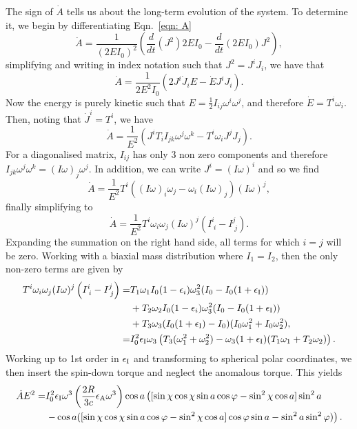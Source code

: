 \documentclass[../full_thesis/full_thesis.tex]{subfiles}
\begin{document}
The sign of $\dot{A}$ tells us about the long-term evolution of the system. To
determine it, we begin by differentiating Eqn.~\eqref{eqn: A}
\begin{equation}
\dot{A}=\frac{1}{(2EI_{0})^{2}}
        \left(\frac{d}{dt}(J^{2})2EI_{0}-\frac{d}{dt}(2EI_{0})J^{2}\right),
\end{equation}
simplifying and writing in index notation such that $J^{2}=J^i J_i$, we have that
\begin{equation}
\dot{A}=\frac{1}{2E^{2}I_0}\left(2J^{i}\dot{J}_{i}E-\dot{E}J^{i}J_{i}\right).
\end{equation}
Now the energy is purely kinetic such that
$E=\frac{1}{2}I_{ij}\omega^{i}\omega^{j}$, and therefore $\dot{E}=T^{i}\omega_{i}$.
Then, noting that $\dot{J}^{i}=T^{i}$, we have
\begin{equation}
\dot{A}=\frac{1}{E^{2}}\left(J^{i}T_{i}I_{jk}\omega^{j}\omega^{k}
                             -T^{i}\omega_{i}J^{j}J_{j}\right).
\end{equation}
For a diagonalised matrix, $I_{ij}$ has only 3 non zero components and therefore
$I_{jk}\omega^{j}\omega^{k}=(I\omega)_{j}\omega^{j}$. In addition, we can write
$J^{i}=(I\omega)^{i}$ and so we find
\begin{equation}
\dot{A}=\frac{1}{E^{2}}T^{i}\left((I\omega)_{i}\omega_{j}
        -\omega_{i}(I\omega)_{j}\right)(I\omega)^{j},
\end{equation}
finally simplifying to
\begin{equation}
\dot{A}=\frac{1}{E^{2}}T^{i}\omega_{i}\omega_{j}
        (I\omega)^{j}\left(I^{i}_{\;i}-I^{j}_{\;j}\right).
\end{equation}
Expanding the
summation on the right hand side, all terms for which $i=j$ will be zero. Working with a biaxial mass
distribution where $I_{1}=I_{2}$, then the only non-zero terms are given by
\begin{align}
T^{i}\omega_{i}\omega_{j}(I\omega)^{j}\left(I^{i}_{\;i}-I^{j}_{\;j}\right) =&
T_{1}\omega_{1}I_{0}(1-\epsilon_{i})\omega^{2}_{3}
(I_{0}-I_{0}(1+\epsilon_{\mathrm{I}}))
\nonumber \\
 & + T_{2}\omega_{2}I_{0}(1-\epsilon_{i})\omega^{2}_{3}(I_{0}-I_{0}(1+\epsilon_{\mathrm{I}}))
\nonumber \\ 
& +
T_{3}\omega_{3}(I_{0}(1+\epsilon_{\mathrm{I}})-I_{0})
               (I_{0}\omega_{1}^{2}+I_{0}\omega_{2}^{2}), \\
=& I_{0}^{2}\epsilon_{\mathrm{I}}\omega_{3}\left(T_{3}(\omega_{1}^{2}+\omega_{2}^{2})
    - \omega_{3}(1+\epsilon_{\mathrm{I}})(T_{1}\omega_{1}+T_{2}\omega_{2})\right).
\end{align}
Working up to 1st order in $\epsilon_{\mathrm{I}}$ and transforming to spherical polar
coordinates, we then insert the spin-down torque and neglect the anomalous torque.
This yields
\begin{align}
\dot{A}E^{2} = & I_{0}^{2}\epsilon_{\mathrm{I}}\omega^{3}
    \left(\frac{2R}{3c}\epsilon_{\mathrm{A}}\omega^{3}\right)
    \cos a \left([\sin \chi \cos \chi \sin a \cos \varphi
                 - \sin^{2}\chi \cos a]\sin^{2} a \right. \nonumber \\
& \left.- \cos a ([\sin \chi \cos \chi \sin a \cos \varphi
                   - \sin^{2}\chi \cos a]\cos \varphi \sin a
                   - \sin^{2}a \sin^{2}\varphi)\right).
\end{align}
\end{document}
